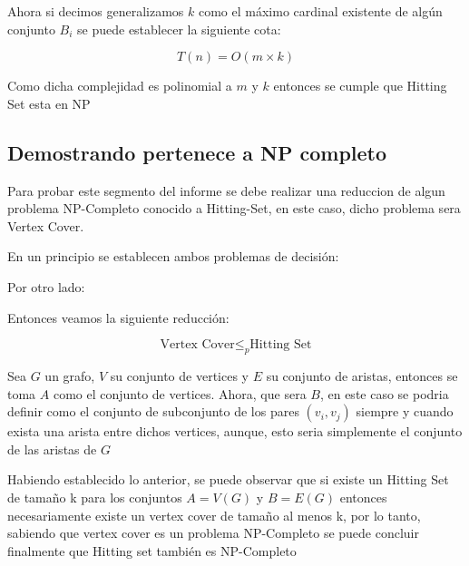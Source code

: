 Ahora si decimos generalizamos $k$ como el máximo cardinal existente de algún conjunto $B_i$ se puede establecer la siguiente cota:

$$
    T(n) = O(m \times k)
$$

Como dicha complejidad es polinomial a $m$ y $k$ entonces se cumple que Hitting Set esta  en NP

\subsection{Demostrando pertenece a NP completo}

Para probar este segmento del informe se debe realizar una reduccion de algun problema NP-Completo conocido a Hitting-Set, en este caso, dicho problema sera Vertex Cover.

En un principio se establecen ambos problemas de decisión: 

\begin{center}
  \begin{minipage}{0.8\textwidth}
  \end{minipage}
\end{center}

Por otro lado: 

\begin{center}
  \begin{minipage}{0.8\textwidth}
  \end{minipage}
\end{center}

Entonces veamos la siguiente reducción:

$$
    \text{Vertex Cover} \leq_p \text{Hitting Set} 
$$

Sea $G$ un grafo, $V$ su conjunto de vertices y $E$ su conjunto de aristas, entonces se toma $A$ como el conjunto de vertices. Ahora, que sera $B$, en este caso se podria definir como el conjunto de subconjunto de los pares $(v_i, v_j)$ siempre y cuando exista una arista entre dichos vertices, aunque, esto seria simplemente el conjunto de las aristas de $G$

Habiendo establecido lo anterior, se puede observar que si existe un Hitting Set de tamaño k  para los conjuntos $A = V(G)$ y $B = E(G)$ entonces necesariamente existe un vertex cover de tamaño al menos k, por lo tanto, sabiendo que vertex cover es un problema NP-Completo se puede concluir finalmente que Hitting set también es NP-Completo 
